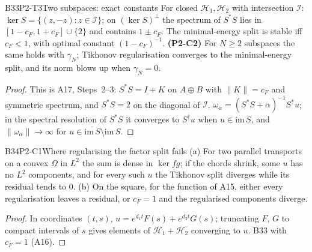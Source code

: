 \begin{dimcard}{B33}{P2-T3}{Two subspaces: exact constants}{\proved}{}
\label{dim:P2-C2}%
For closed $\mathcal H_1,\mathcal H_2$ with intersection $\mathcal I$: $\ker S=\{(z,-z):z\in\mathcal I\}$; on $(\ker S)^\perp$ the spectrum of $S^*S$ lies in $[1-c_F,1+c_F]\cup\{2\}$ and contains $1\pm c_F$. The minimal-energy split is stable iff $c_F<1$, with optimal constant $(1-c_F)^{-1}$. \textbf{(P2-C2)} For $N\ge2$ subspaces the same holds with $\gamma_N$; Tikhonov regularisation converges to the minimal-energy split, and its norm blows up when $\gamma_N=0$.
\end{dimcard}
\begin{proof}
This is A17, Steps~2--3: $S^*S=I+K$ on $A\oplus B$ with $\|K\|=c_F$ and symmetric spectrum, and $S^*S=2$ on the diagonal of $\mathcal I$.
$\omega_\alpha=(S^*S+\alpha)^{-1}S^*u$; in the spectral resolution of $S^*S$ it converges to $S^\dagger u$ when $u\in\mathrm{im}\,S$, and $\|\omega_\alpha\|\to\infty$ for $u\in\overline{\mathrm{im}\,S}\setminus\mathrm{im}\,S$.
\end{proof}

\begin{dimcard}{B34}{P2-C1}{Where regularising the factor split fails}{\proved}{}
(a) For two parallel transports on a convex $\Omega$ in $L^2$ the sum is dense in $\ker fg$; if the chords shrink, some $u$ has no $L^2$ components, and for every such $u$ the Tikhonov split diverges while its residual tends to $0$. (b) On the square, for the function of A15, either every regularisation leaves a residual, or $c_F=1$ and the regularised components diverge.
\end{dimcard}
\begin{proof}
In coordinates $(t,s)$, $u=e^{d_1t}F(s)+e^{d_2t}G(s)$; truncating $F$, $G$ to compact intervals of $s$ gives elements of $\mathcal H_1+\mathcal H_2$ converging to $u$.
B33 with $c_F=1$ (A16).
\end{proof}

